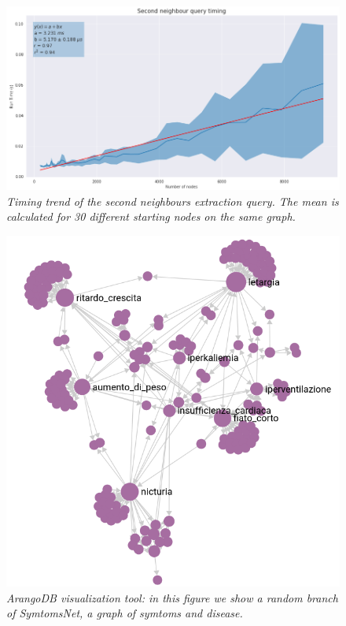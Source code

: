 \documentclass[11pt,twocolumn]{article}
\begin{document}
\begin{figure}[ht]
   \includegraphics[width=\linewidth]{images/traverse_0_2.png}
   \caption{\small{\textit{Timing trend of the second neighbours extraction query. The mean is calculated for 30 different starting nodes on the same graph.}}}
   \label{fig:2}
\end{figure}

\begin{figure}[ht]
   \includegraphics[width=\linewidth]{images/Sym_Net_crop.png}
   \caption{\small{\textit{ArangoDB visualization tool: in this figure we show a random branch of SymtomsNet, a graph of symtoms and disease.}}}
   \label{fig:3}
\end{figure}
\end{document}
